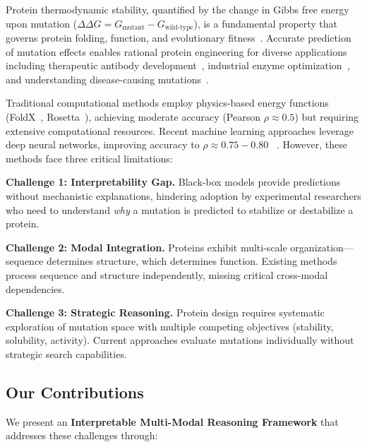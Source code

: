 \documentclass[11pt]{article}
\newcommand{\ddG}{\Delta\Delta G}
\begin{document}

Protein thermodynamic stability, quantified by the change in Gibbs free energy
upon mutation ($\ddG = G_{\text{mutant}} - G_{\text{wild-type}}$), is a
fundamental property that governs protein folding, function, and evolutionary
fitness~\cite{tokuriki2009stability}. Accurate prediction of mutation effects
enables rational protein engineering for diverse applications including
therapeutic antibody development~\cite{jain2017biophysical}, industrial enzyme
optimization~\citep{HoweEvolver2021NatureChemBio}, and understanding
disease-causing mutations~\cite{yue2005loss}.

Traditional computational methods employ physics-based energy functions 
(FoldX~\cite{schymkowitz2005foldx}, Rosetta~\cite{kellogg2011role}), achieving
moderate accuracy (Pearson $\rho \approx 0.5$) but requiring extensive
computational resources. Recent machine learning approaches leverage deep
neural networks, improving accuracy to $\rho \approx 0.75-0.80$
~\cite{meier2021language,cao2019deepddg}. However, these methods face three
critical limitations:

\textbf{Challenge 1: Interpretability Gap.} Black-box models provide
predictions without mechanistic explanations, hindering adoption by
experimental researchers who need to understand \textit{why} a mutation is
predicted to stabilize or destabilize a protein.

\textbf{Challenge 2: Modal Integration.} Proteins exhibit multi-scale
organization—sequence determines structure, which determines function. Existing
methods process sequence and structure independently, missing critical
cross-modal dependencies.

\textbf{Challenge 3: Strategic Reasoning.} Protein design requires systematic
exploration of mutation space with multiple competing objectives (stability,
solubility, activity). Current approaches evaluate mutations individually
without strategic search capabilities.

\subsection*{Our Contributions}

We present an \textbf{Interpretable Multi-Modal Reasoning Framework} that
addresses these challenges through:
\end{document}
